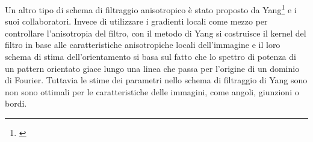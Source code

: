 Un altro tipo di schema di filtraggio anisotropico è stato proposto da Yang\footnote{\cite{YANG}} e i suoi collaboratori. Invece di utilizzare i gradienti locali come mezzo per controllare l'anisotropia del filtro, con il metodo di Yang si costruisce il kernel del filtro in base alle caratteristiche anisotropiche locali dell'immagine e il loro schema di stima dell'orientamento si basa sul fatto che lo spettro di potenza di un pattern orientato giace lungo una linea che passa per l'origine di un dominio di Fourier.
Tuttavia le stime dei parametri nello schema di filtraggio di Yang sono
non sono ottimali per le caratteristiche delle immagini, come angoli, giunzioni o bordi.